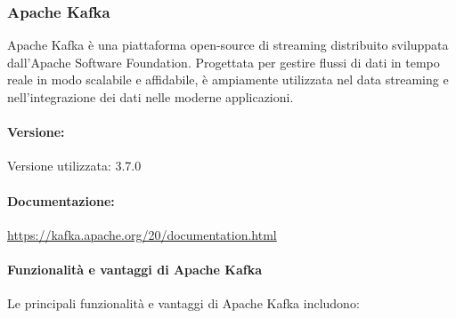 \subsubsection{Apache Kafka}
Apache Kafka è una piattaforma open-source di streaming distribuito sviluppata dall'Apache Software Foundation. Progettata per gestire flussi di dati in tempo reale in modo scalabile e affidabile, è ampiamente utilizzata nel data streaming e nell'integrazione dei dati nelle moderne applicazioni.

\paragraph{Versione:}
Versione utilizzata: 3.7.0

\paragraph{Documentazione:}
\url{https://kafka.apache.org/20/documentation.html}

\paragraph{Funzionalità e vantaggi di Apache Kafka}
Le principali funzionalità e vantaggi di Apache Kafka includono:

